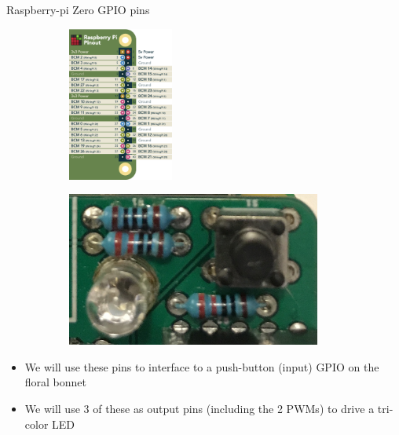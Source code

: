 \begin{frame}
   {Raspberry-pi Zero GPIO pins}
   \begin{figure}[H]
      \centering
      \begin{subfigure}{0.4\textwidth}
         \centering
         \includegraphics[height=2in]{IMAGES/rpi-pins-gpio}
      \end{subfigure}
      \begin{subfigure}{0.4\textwidth}
         \centering
         \includegraphics[height=2in]{IMAGES/GPIO-button-LED}
      \end{subfigure}
   \end{figure}
   \begin{itemize}
      \item We will use these pins to interface to a push-button (input) GPIO
	      on the floral bonnet
      \item We will use 3 of these as output pins (including the 2 PWMs) to drive
	      a tri-color LED
   \end{itemize}
\end{frame}

\cprotect{}


